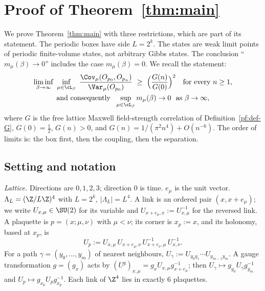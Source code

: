 \section{Proof of Theorem~\ref{thm:main}}\label{sec:proof}

We prove Theorem~\ref{thm:main} with three restrictions, which are part of its statement.
The periodic boxes have side $L=2^k$.
The states are weak limit points of periodic finite-volume states, not arbitrary Gibbs states.
The conclusion ``$m_\mu(\beta)\to0$'' includes the case $m_\mu(\beta)=0$.
We recall the statement:
\begin{equation}\label{pf:eq-main}
\begin{gathered}
\liminf_{\beta\to\infty}\ \inf_{\mu\in\cL_\beta}\ \frac{\Cov_\mu(O_{p_0},O_{p_n})}{\Var_\mu(O_{p_0})}\ \ge\ \Big(\frac{G(n)}{G(0)}\Big)^2\quad\text{for every } n\ge1,\\
\text{and consequently }\ \sup_{\mu\in\cL_\beta}m_\mu(\beta)\to0\ \text{ as }\beta\to\infty,
\end{gathered}
\end{equation}
where $G$ is the free lattice Maxwell field-strength correlation of Definition~\ref{pf:def-G}, $G(0)=\tfrac12$, $G(n)>0$, and $G(n)=1/(\pi^2n^4)+O(n^{-6})$.
The order of limits is: the box first, then the coupling, then the separation.

\subsection{Setting and notation}\label{pf:sec-setting}

\emph{Lattice.} Directions are $0,1,2,3$; direction $0$ is time. $e_\mu$ is the unit vector. $\Lambda_L=(\Z/L\Z)^4$ with $L=2^k$, $|\Lambda_L|=L^4$. A link is an ordered pair $(x,x+e_\mu)$; we write $U_{x,\mu}\in\SU(2)$ for its variable and $U_{x+e_\mu,x}:=U_{x,\mu}^{-1}$ for the reversed link. A plaquette is $p=(x;\mu,\nu)$ with $\mu<\nu$; its corner is $x_p:=x$, and its holonomy, based at $x_p$, is
\[
U_p:=U_{x,\mu}\,U_{x+e_\mu,\nu}\,U_{x+e_\nu,\mu}^{-1}\,U_{x,\nu}^{-1}.
\]
For a path $\gamma=(y_0,\dots,y_m)$ of nearest neighbours, $U_\gamma:=U_{y_0y_1}\cdots U_{y_{m-1}y_m}$.
A gauge transformation $g=(g_x)$ acts by $(U^g)_{x,\mu}=g_xU_{x,\mu}g_{x+e_\mu}^{-1}$; then $U_\gamma\mapsto g_{y_0}U_\gamma g_{y_m}^{-1}$ and $U_p\mapsto g_{x_p}U_pg_{x_p}^{-1}$.
Each link of $\Z^4$ lies in exactly $6$ plaquettes.

